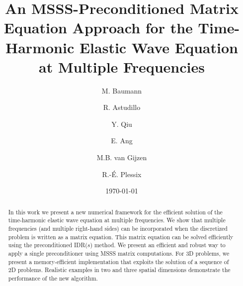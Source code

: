 \title{An MSSS-Preconditioned Matrix Equation Approach for the Time-Harmonic Elastic Wave Equation at Multiple Frequencies}

\author{M. Baumann \and R. Astudillo \and Y. Qiu \and E. Ang \and M.B. van Gijzen \and R.-\'E. Plessix}


\date{\today}

\maketitle

\begin{abstract}
In this work we present a new numerical framework for the efficient solution of the time-harmonic elastic wave equation at multiple frequencies. We show that multiple frequencies (and multiple right-hand sides) can be incorporated when the discretized problem is written as a matrix equation. This matrix equation can be solved efficiently using the preconditioned IDR($s$) method. We present an efficient and robust way to apply a single preconditioner using MSSS matrix computations. For 3D problems, we present a memory-efficient implementation that exploits the solution of a sequence of 2D problems. Realistic examples in two and three spatial dimensions demonstrate the performance of the new algorithm.

\end{abstract}

